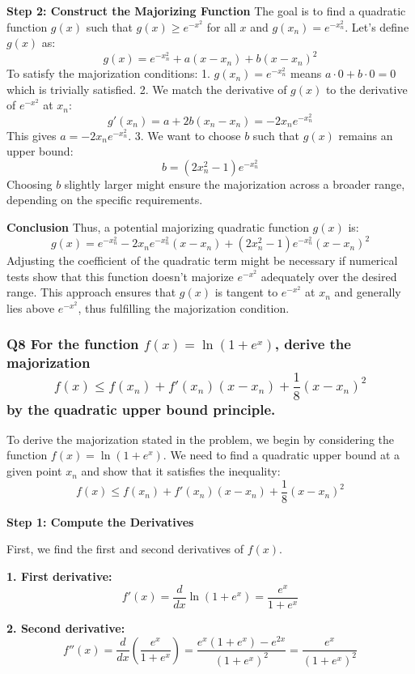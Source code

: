 \documentclass[8pt]{article}
\begin{document}
\textbf{Step 2: Construct the Majorizing Function}
The goal is to find a quadratic function \( g(x) \) such that \( g(x) \geq e^{-x^2} \) for all \( x \) and \( g(x_n) = e^{-x_n^2} \). Let's define \( g(x) \) as:
\[
g(x) = e^{-x_n^2} + a(x-x_n) + b(x-x_n)^2
\]
To satisfy the majorization conditions:
1. \( g(x_n) = e^{-x_n^2} \) means \( a \cdot 0 + b \cdot 0 = 0 \) which is trivially satisfied.
2. We match the derivative of \( g(x) \) to the derivative of \( e^{-x^2} \) at \( x_n \):
   \[
   g'(x_n) = a + 2b(x_n-x_n) = -2x_n e^{-x_n^2}
   \]
   This gives \( a = -2x_n e^{-x_n^2} \).
3. We want to choose \( b \) such that \( g(x) \) remains an upper bound:
   \[
   b = (2x_n^2 - 1) e^{-x_n^2}
   \]
   Choosing \( b \) slightly larger might ensure the majorization across a broader range, depending on the specific requirements.

\textbf{Conclusion}
Thus, a potential majorizing quadratic function \( g(x) \) is:
\[
g(x) = e^{-x_n^2} - 2x_n e^{-x_n^2} (x - x_n) + (2x_n^2 - 1) e^{-x_n^2} (x - x_n)^2
\]
Adjusting the coefficient of the quadratic term might be necessary if numerical tests show that this function doesn't majorize \( e^{-x^2} \) adequately over the desired range. This approach ensures that \( g(x) \) is tangent to \( e^{-x^2} \) at \( x_n \) and generally lies above \( e^{-x^2} \), thus fulfilling the majorization condition.

\subsubsection*{Q8 For the function \( f(x) = \ln(1 + e^x) \), derive the majorization
\[
f(x) \leq f(x_n) + f'(x_n)(x - x_n) + \frac{1}{8} (x - x_n)^2
\]
by the quadratic upper bound principle.}

To derive the majorization stated in the problem, we begin by considering the function \( f(x) = \ln(1 + e^x) \). We need to find a quadratic upper bound at a given point \( x_n \) and show that it satisfies the inequality:
\[
f(x) \leq f(x_n) + f'(x_n)(x - x_n) + \frac{1}{8} (x - x_n)^2
\]

\textbf{Step 1: Compute the Derivatives}

First, we find the first and second derivatives of \( f(x) \).

\textbf{1. First derivative:}
   \[
   f'(x) = \frac{d}{dx} \ln(1 + e^x) = \frac{e^x}{1 + e^x}
   \]

\textbf{2. Second derivative:}
   \[
   f''(x) = \frac{d}{dx} \left( \frac{e^x}{1 + e^x} \right) = \frac{e^x(1 + e^x) - e^{2x}}{(1 + e^x)^2} = \frac{e^x}{(1 + e^x)^2}
   \]
\end{document}
